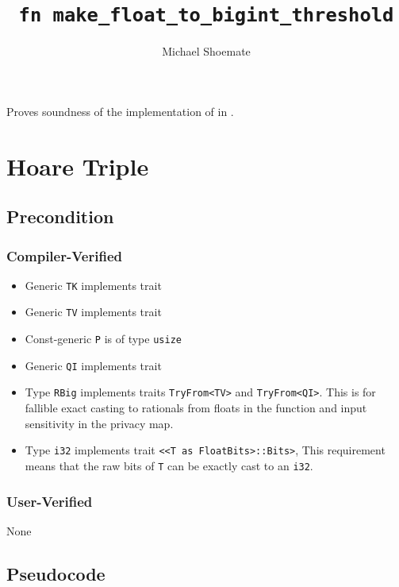 \documentclass{article}
\title{\texttt{fn make\_float\_to\_bigint\_threshold}}
\author{Michael Shoemate}
\date{}
\begin{document}
\maketitle

\contrib
Proves soundness of the implementation of  in .

\section{Hoare Triple}
\subsection*{Precondition}
\subsubsection*{Compiler-Verified}

\begin{itemize}
    \item Generic \texttt{TK} implements trait 
    \item Generic \texttt{TV} implements trait 
    \item Const-generic \texttt{P} is of type \texttt{usize}
    \item Generic \texttt{QI} implements trait 
    \item Type \texttt{RBig} implements traits \texttt{TryFrom<TV>} and \texttt{TryFrom<QI>}.
        This is for fallible exact casting to rationals from floats in the function and input sensitivity in the privacy map.
    \item Type \texttt{i32} implements trait \texttt{<<T as FloatBits>::Bits>},
        This requirement means that the raw bits of \texttt{T} can be exactly cast to an \texttt{i32}.
\end{itemize}

\subsubsection*{User-Verified}
None

\subsection*{Pseudocode}

\end{document}
